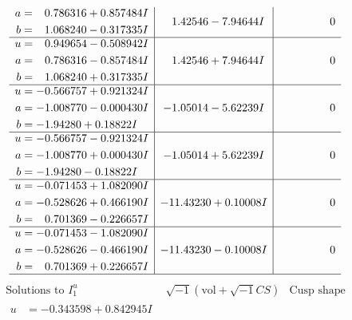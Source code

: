 \documentclass[1p]{elsarticle_modified}
\theoremstyle{definition}
\newcommand{\I}{\sqrt{-1}}
\begin{document}
$$\begin{array}{c|c|c}
\begin{aligned}
a &= \phantom{-}0.786316 + 0.857484 I \\
b &= \phantom{-}1.068240 - 0.317335 I\end{aligned}
 & \phantom{-}1.42546 - 7.94644 I & \phantom{-0.000000 } 0 \\ \hline\begin{aligned}
u &= \phantom{-}0.949654 - 0.508942 I \\
a &= \phantom{-}0.786316 - 0.857484 I \\
b &= \phantom{-}1.068240 + 0.317335 I\end{aligned}
 & \phantom{-}1.42546 + 7.94644 I & \phantom{-0.000000 } 0 \\ \hline\begin{aligned}
u &= -0.566757 + 0.921324 I \\
a &= -1.008770 - 0.000430 I \\
b &= -1.94280 + 0.18822 I\end{aligned}
 & -1.05014 - 5.62239 I & \phantom{-0.000000 } 0 \\ \hline\begin{aligned}
u &= -0.566757 - 0.921324 I \\
a &= -1.008770 + 0.000430 I \\
b &= -1.94280 - 0.18822 I\end{aligned}
 & -1.05014 + 5.62239 I & \phantom{-0.000000 } 0 \\ \hline\begin{aligned}
u &= -0.071453 + 1.082090 I \\
a &= -0.528626 + 0.466190 I \\
b &= \phantom{-}0.701369 - 0.226657 I\end{aligned}
 & -11.43230 + 0.10008 I & \phantom{-0.000000 } 0 \\ \hline\begin{aligned}
u &= -0.071453 - 1.082090 I \\
a &= -0.528626 - 0.466190 I \\
b &= \phantom{-}0.701369 + 0.226657 I\end{aligned}
 & -11.43230 - 0.10008 I & \phantom{-0.000000 } 0\\
 \hline 
 \end{array}$$\newpage$$\begin{array}{c|c|c}  
\text{Solutions to }I^u_{1}& \I (\text{vol} + \sqrt{-1}CS) & \text{Cusp shape}\\
 \hline 
\begin{aligned}
u &= -0.343598 + 0.842945 I \\

\end{aligned}
\end{array}$$
\end{document}
